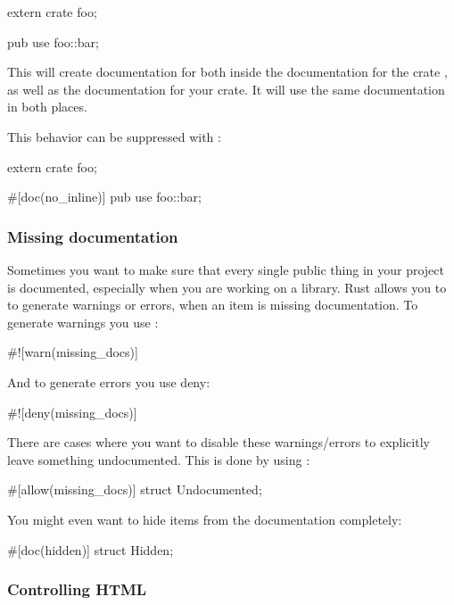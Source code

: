 \begin{rustc}
extern crate foo;

pub use foo::bar;
\end{rustc}

This will create documentation for  both inside the documentation for the crate , as well as the documentation 
for your crate. It will use the same documentation in both places.

\blank

This behavior can be suppressed with :

\begin{rustc}
extern crate foo;

#[doc(no_inline)]
pub use foo::bar;
\end{rustc}

\subsubsection*{Missing documentation}

Sometimes you want to make sure that every single public thing in your project is documented, especially when you are working on 
a library. Rust allows you to to generate warnings or errors, when an item is missing documentation. To generate warnings you use 
:

\begin{rustc}
#![warn(missing_docs)]
\end{rustc}

And to generate errors you use deny:

\begin{rustc}
#![deny(missing_docs)]
\end{rustc}

There are cases where you want to disable these warnings/errors to explicitly leave something undocumented. This is done by using :

\begin{rustc}
#[allow(missing_docs)]
struct Undocumented;
\end{rustc}

You might even want to hide items from the documentation completely:

\begin{rustc}
#[doc(hidden)]
struct Hidden;
\end{rustc}

\subsubsection*{Controlling HTML}

